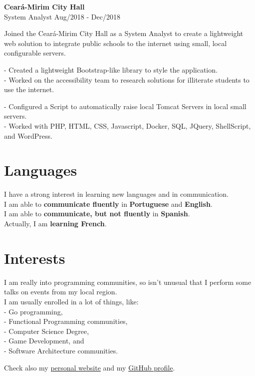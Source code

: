 \documentclass[12pt]{article}
\newcommand{\jobentry}[3]{\textbf{#1} \\ #2 \hfill #3}
\begin{document}
\jobentry{Ceará-Mirim City Hall}{System Analyst}{Aug/2018 - Dec/2018}

\smallskip

Joined the Ceará-Mirim City Hall as a System Analyst to create a lightweight web solution to integrate public schools to the internet using small, local configurable servers.

\smallskip

\begin{paracol}{2}

    - Created a lightweight Bootstrap-like library to style the application. \\
    - Worked on the accessibility team to research solutions for illiterate students to use the internet. \\

    \switchcolumn
    
    - Configured a Script to automatically raise local Tomcat Servers in local small servers. \\
    - Worked with PHP, HTML, CSS, Javascript, Docker, SQL, JQuery, ShellScript, and WordPress.

\end{paracol}

\begin{paracol}{2}

    \section{Languages}

    I have a strong interest in learning new languages and in communication. \\
    I am able to \textbf{communicate fluently} in \textbf{Portuguese} and \textbf{English}. \\
    I am able to \textbf{communicate, but not fluently} in \textbf{Spanish}. \\
    Actually, I am \textbf{learning French}.

    \switchcolumn

    \section{Interests}

    I am really into programming communities, so isn't unusual that I perform some talks on events from my local region. \\
    I am usually enrolled in a lot of things, like: \\

    - Go programming, \\
    - Functional Programming communities, \\
    - Computer Science Degree, \\
    - Game Development, and \\
    - Software Architecture communities.
    
\end{paracol}

\smallskip

Check also my \href{www.viniciusernani.com/}{personal website} and my \href{www.github.com/erneani}{GitHub profile}.
\end{document}
